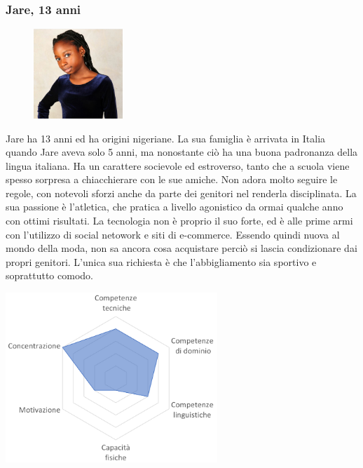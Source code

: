 \documentclass[12pt,a4paper]{report}
\begin{document}
\subsubsection*{Jare, 13 anni}
\begin{figure}
  \centering
    \includegraphics[width=0.3\textwidth]{"Images Latex/Personas/Jare"}
\end{figure}
Jare ha 13 anni ed ha origini nigeriane. La sua famiglia è arrivata in Italia quando Jare aveva solo 5 anni, ma nonostante ciò ha una buona padronanza della lingua italiana. Ha un carattere socievole ed estroverso, tanto che a scuola viene spesso sorpresa a chiacchierare con le sue amiche. Non adora molto seguire le regole, con notevoli sforzi anche da parte dei genitori nel renderla disciplinata. La sua passione è l'atletica, che pratica a livello agonistico da ormai qualche anno con ottimi risultati. La tecnologia non è proprio il suo forte, ed è alle prime armi con l'utilizzo di social netowork e siti di e-commerce. Essendo quindi nuova al mondo della moda, non sa ancora cosa acquistare perciò si lascia condizionare dai propri genitori. L'unica sua richiesta è che l'abbigliamento sia sportivo e soprattutto comodo.
\begin{center}
  \includegraphics[width=0.6\textwidth]{"Images Latex/Personas/Jare13"}
\end{center}
\newpage
\end{document}
